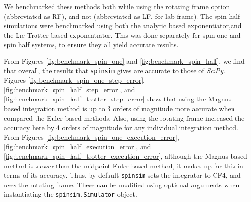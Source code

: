 \documentclass{jors}
\begin{document}
			We benchmarked these methods both while using the rotating frame option (abbreviated as RF), and not (abbreviated as LF, for lab frame). The spin half simulations were benchmarked using both the analytic based exponentiator,and the Lie Trotter based exponentiator. This was done separately for spin one and spin half systems, to ensure they all yield accurate results.

			From Figures \ref{fig:benchmark_spin_one} and \ref{fig:benchmark_spin_half}, we find that overall, the results that \texttt{spinsim} gives are accurate to those of \emph{SciPy}. Figures \ref{fig:benchmark_spin_one_step_error}, \ref{fig:benchmark_spin_half_step_error}, and \ref{fig:benchmark_spin_half_trotter_step_error} show that using the Magnus based integration method is up to 3 orders of magnitude more accurate when compared the Euler based methods. Also, using the rotating frame increased the accuracy here by 4 orders of magnitude for any individual integration method. From Figures \ref{fig:benchmark_spin_one_execution_error}, \ref{fig:benchmark_spin_half_execution_error}, and \ref{fig:benchmark_spin_half_trotter_execution_error}, although the Magnus based method is slower than the midpoint Euler based method, it makes up for this in terms of its accuracy. Thus, by default \texttt{spinsim} sets the integrator to CF4, and uses the rotating frame. These can be modified using optional arguments when instantiating the \texttt{spinsim.Simulator} object.
\end{document}
